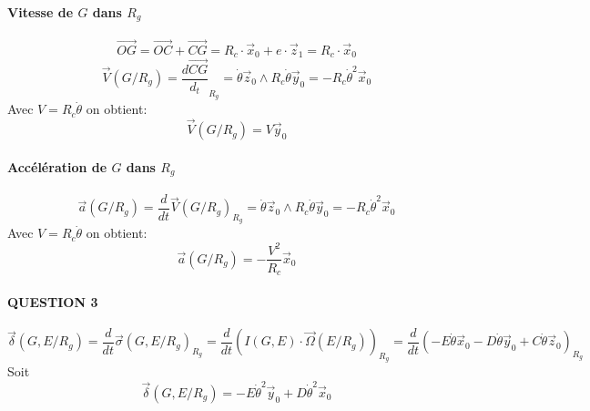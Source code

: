 \paragraph{Vitesse de $G$ dans $R_g$}
\[\vec{OG} = \vec{OC} + \vec{CG} = R_c \cdot \vec x_0 + e\cdot \vec z_1 = R_c \cdot \vec x_0\]
\[\vec V(G/R_g) = \frac{d\vec{CG}}{d_t}_{R_g} = \dot \theta \vec z_0 \wedge R_c \dot \theta \vec y_0 = -R_c \dot \theta^2 \vec x_0 \]
Avec $ V = R_c \dot \theta$ on obtient:
\begin{equation}
	\vec V(G / R_g) =V \vec y_0
\end{equation}
\paragraph{Accélération de $G$ dans $R_g$}
\[\vec a(G/R_g) = \frac{d}{dt}\vec V(G/R_g)_{R_g} = \dot \theta \vec z_0 \wedge R_c \dot \theta \vec y_0 = - R_c \dot \theta^2 \vec x_0\]
Avec $V=R_c \dot \theta$ on obtient:
\begin{equation}
	\vec a(G/R_g) = - \frac{V^2}{R_c} \vec x_0
\end{equation}
\paragraph{QUESTION 3}
\[ \vec \delta (G, E / R_g) = \frac{d}{dt} \vec \sigma (G, E/R_g)_{R_g} = \frac{d}{dt} \left( I(G,E) \cdot \vec \Omega (E / R_g) \right)_{R_g} = \frac{d}{dt} \left( - E \dot \theta \vec x_0 - D \dot \theta \vec y_0 + C \dot \theta \vec z_0 \right)_{R_g} \]
Soit
\begin{equation}
	\vec \delta (G, E/R_g) = -E \dot \theta^2 \vec y_0 + D \dot \theta^2 \vec x_0
\end{equation}
